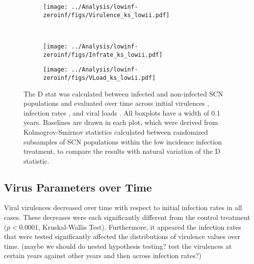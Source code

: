 \begin{figure}[ht]
	\centering
		
		
	\begin{subfigure}[b]{0.45\textwidth}{
		\texttt{[image: ../Analysis/lowinf-zeroinf/figs/Virulence\_ks\_lowii.pdf]}
		\label{fig:ks_Vir}  %
		}
	\end{subfigure}
~  %
	\begin{subfigure}[b]{0.45\textwidth}{
		\texttt{[image: ../Analysis/lowinf-zeroinf/figs/Infrate\_ks\_lowii.pdf]} 
		\label{fig:ks_InfR}
		}
	\end{subfigure}
	
	\begin{subfigure}[b]{0.8\textwidth}{
		\centering
		\texttt{[image: ../Analysis/lowinf-zeroinf/figs/VLoad\_ks\_lowii.pdf]}
		\label{fig:ks_VLoad}
		}
	\end{subfigure}

\caption[Kolmogrov-Smirnov evaluation of Nematode Populations over Time]{The D stat was calculated between infected and non-infected SCN populations and evaluated over time across initial virulences , infection rates \protect{}, and viral loads \protect{}. All boxplots have a width of 0.1 years.  Baselines are drawn in each plot, which were derived from Kolmogrov-Smirnov statistics calculated between randomized subsamples of SCN populations within the low incidence infection treatment, to compare the results with natural variation of the D statistic.}
\end{figure}


\subsection{Virus Parameters over Time}
	Viral virulences decreased over time with respect to initial infection rates in all cases. These decreases were each significantly different from the control treatment ($p < 0.0001$, Kruskal-Wallis Test). Furthermore, it appeared the infection rates that were tested significantly affected the distributions of virulence values over time. (maybe we should do nested hypothesis testing?  test the virulences at certain years against other years and then across infection rates?)    


